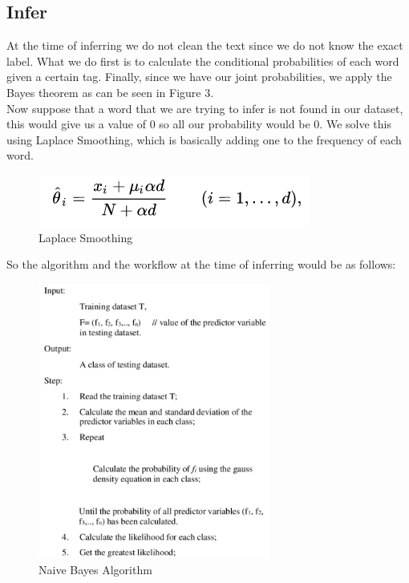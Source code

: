 \documentclass[sigconf,12pt,review=false,natbib=false]{acmart}
\begin{document}
\subsection{Infer}

At the time of inferring we do not clean the text since we do not know the exact label. What we do
first is to calculate the conditional probabilities of each word given a certain tag. Finally,
since we have our joint probabilities, we apply the Bayes theorem as can be seen in Figure 3. \\

Now suppose that a word that we are trying to infer is not found in our dataset, this would give us
a value of 0 so all our probability would be 0. We solve this using Laplace Smoothing, which is
basically adding one to the frequency of each word. \\

\begin{figure}[h!]
    \centering
    \includegraphics{laplace}
    \caption{Laplace Smoothing}
    \label{fig:laplace}
\end{figure}

So the algorithm and the workflow at the time of inferring would be as follows:

\begin{figure}[h!]
    \centering
    \includegraphics[width=3in]{algorithm}
    \caption{Naive Bayes Algorithm}
    \label{fig:algorithm}
\end{figure}
\end{document}
